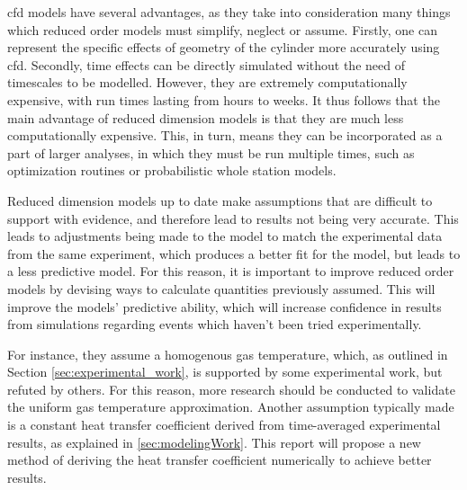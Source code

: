 

\Gls{cfd} models have several advantages, as they take into consideration many things which reduced order models must simplify, neglect or assume. Firstly, one can represent the specific effects of geometry of the cylinder more accurately using \gls{cfd}. Secondly, time effects can be directly simulated without the need of timescales  to be modelled. However, they are extremely computationally expensive, with run times lasting from hours to weeks. It thus follows that the main advantage of reduced dimension models is that they are much less computationally expensive. This, in turn, means they can be incorporated as a part of larger analyses, in which they must be run multiple times, such as optimization routines or probabilistic whole station models.


Reduced dimension models up to date make assumptions that are difficult to support with evidence, and therefore  lead to results not being very accurate. This leads to adjustments being made to the model to match the experimental data from the same experiment, which produces a better fit for the model, but leads to a less predictive model. For this reason, it is important to improve reduced order models by devising ways to calculate quantities previously assumed. This will improve the models' predictive ability, which will increase confidence in results from simulations regarding events which haven't been tried experimentally.



For instance, they  assume a homogenous gas temperature, which, as outlined in Section \ref{sec:experimental_work}, is supported by some experimental work, but refuted by others. For this reason, more research should be conducted to validate the uniform gas temperature approximation. Another assumption typically made is a constant heat transfer coefficient derived from time-averaged experimental results, as explained in \cref{sec:modelingWork}. This report will propose a new method of deriving the heat transfer coefficient numerically to achieve better results.



